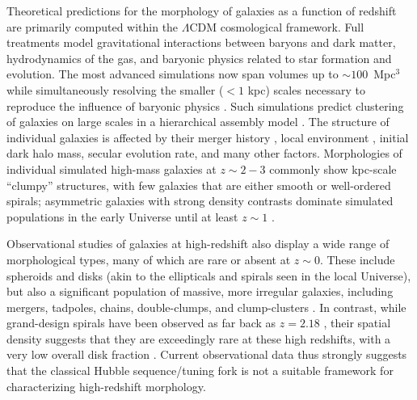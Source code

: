 \documentclass[twocolumn]{aastex6}
\begin{document}
Theoretical predictions for the morphology of galaxies as a function of
redshift are primarily computed within the $\Lambda$CDM cosmological framework.
Full treatments model gravitational interactions between baryons and dark
matter, hydrodynamics of the gas, and baryonic physics related to star
formation and evolution. The most advanced simulations now span volumes up to
$\sim100$~Mpc$^3$ while simultaneously resolving the smaller ($<1$ kpc) scales
necessary to reproduce the influence of baryonic physics \citep{vog14a,sch15}.
Such simulations predict clustering of galaxies on large scales in a
hierarchical assembly model \citep{sil12}. The structure of individual galaxies
is affected by their merger history \citep{too72,ste02,hop10}, local
environment \citep[\eg, the morphology-density relation;][]{dre80}, initial
dark halo mass, secular evolution rate, and many other factors. Morphologies of
individual simulated high-mass galaxies at $z\sim2-3$ commonly show kpc-scale
``clumpy'' structures, with few galaxies that are either smooth or well-ordered
spirals; asymmetric galaxies with strong density contrasts dominate simulated
populations in the early Universe until at least $z\sim1$ \citep{bel12,gen14}. 

Observational studies of galaxies at high-redshift also display a wide range of
morphological types, many of which are rare or absent at $z\sim0$.  These
include spheroids and disks (akin to the ellipticals and spirals seen in the
local Universe), but also a significant population of massive, more irregular
galaxies, including mergers, tadpoles, chains, double-clumps, and
clump-clusters \citep{elm05,elm07,cam11a,for11a,kar15}.  In contrast, while
grand-design spirals have been observed as far back as $z=2.18$ \citep{law12},
their spatial density suggests that they are exceedingly rare at these high
redshifts, with a very low overall disk fraction \citep{mor13}. Current
observational data thus strongly suggests that the classical Hubble
sequence/tuning fork \citep{hub36} is not a suitable framework for
characterizing high-redshift morphology. 
\end{document}
